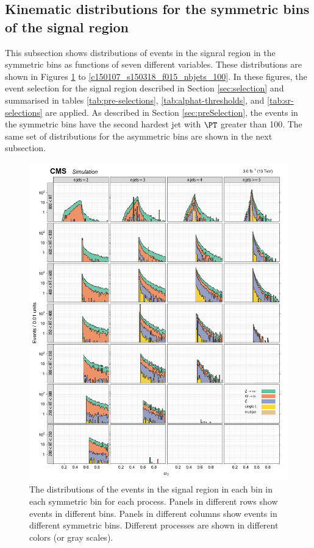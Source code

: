 \subsection{Kinematic distributions for the symmetric \njet bins of the signal region}

This subsection shows distributions of events in the signral region in
the symmetric \njet bins as functions of seven different variables.
These distributions are shown in Figures
\ref{c150107_s150318_f015_alphaT_100} to
\ref{c150107_s150318_f015_nbjets_100}. In these figures, the event
selection for the signal region described in Section
\ref{sec:selection} and summarised in tables \ref{tab:pre-selections},
\ref{tab:alphat-thresholds}, and \ref{tab:sr-selections} are applied.
As described in Section \ref{sec:preSelection}, the events in the
symmetric \njet bins have the second hardest jet with $\PT$ greater
than 100\gev. The same set of distributions for the asymmetric \njet
bins are shown in the next subsection.

\begin{figure}[!h]
\centering
\includegraphics[scale=0.95]{figures/kiplots/c150107_s150318_f015_alphaT_100}
\caption{The \alphat distributions of the events in the signal region
in each \scalht bin in each symmetric \njet bin for each process.
Panels in different rows show events in different \scalht bins. Panels
in different columns show events in different symmetric \njet bins.
Different processes are shown in different colors (or gray scales).}
\label{c150107_s150318_f015_alphaT_100}
\end{figure}

